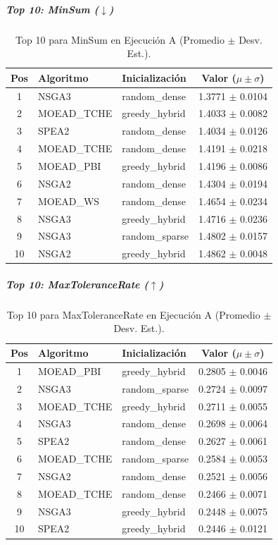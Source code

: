\subparagraph{Top 10: MinSum ($\downarrow$)}
\begin{table}[H]
    \centering
    \begin{tabular}{cllc}
        \toprule
        Pos & Algoritmo & Inicialización & Valor ($\mu \pm \sigma$) \\
        \midrule
        1 & NSGA3 & random\_dense & 1.3771 $\pm$ 0.0104 \\
        2 & MOEAD\_TCHE & greedy\_hybrid & 1.4033 $\pm$ 0.0082 \\
        3 & SPEA2 & random\_dense & 1.4034 $\pm$ 0.0126 \\
        4 & MOEAD\_TCHE & random\_dense & 1.4191 $\pm$ 0.0218 \\
        5 & MOEAD\_PBI & greedy\_hybrid & 1.4196 $\pm$ 0.0086 \\
        6 & NSGA2 & random\_dense & 1.4304 $\pm$ 0.0194 \\
        7 & MOEAD\_WS & random\_dense & 1.4654 $\pm$ 0.0234 \\
        8 & NSGA3 & greedy\_hybrid & 1.4716 $\pm$ 0.0236 \\
        9 & NSGA3 & random\_sparse & 1.4802 $\pm$ 0.0157 \\
        10 & NSGA2 & greedy\_hybrid & 1.4862 $\pm$ 0.0048 \\
        \bottomrule
    \end{tabular}
    \caption{Top 10 para MinSum en Ejecución A (Promedio $\pm$ Desv. Est.).}
\end{table}

\subparagraph{Top 10: MaxToleranceRate ($\uparrow$)}
\begin{table}[H]
    \centering
    \begin{tabular}{cllc}
        \toprule
        Pos & Algoritmo & Inicialización & Valor ($\mu \pm \sigma$) \\
        \midrule
        1 & MOEAD\_PBI & greedy\_hybrid & 0.2805 $\pm$ 0.0046 \\
        2 & NSGA3 & random\_sparse & 0.2724 $\pm$ 0.0097 \\
        3 & MOEAD\_TCHE & greedy\_hybrid & 0.2711 $\pm$ 0.0055 \\
        4 & NSGA3 & random\_dense & 0.2698 $\pm$ 0.0064 \\
        5 & SPEA2 & random\_dense & 0.2627 $\pm$ 0.0061 \\
        6 & MOEAD\_TCHE & random\_sparse & 0.2584 $\pm$ 0.0053 \\
        7 & NSGA2 & random\_dense & 0.2521 $\pm$ 0.0056 \\
        8 & MOEAD\_TCHE & random\_dense & 0.2466 $\pm$ 0.0071 \\
        9 & NSGA3 & greedy\_hybrid & 0.2448 $\pm$ 0.0075 \\
        10 & SPEA2 & greedy\_hybrid & 0.2446 $\pm$ 0.0121 \\
        \bottomrule
    \end{tabular}
    \caption{Top 10 para MaxToleranceRate en Ejecución A (Promedio $\pm$ Desv. Est.).}
\end{table}

